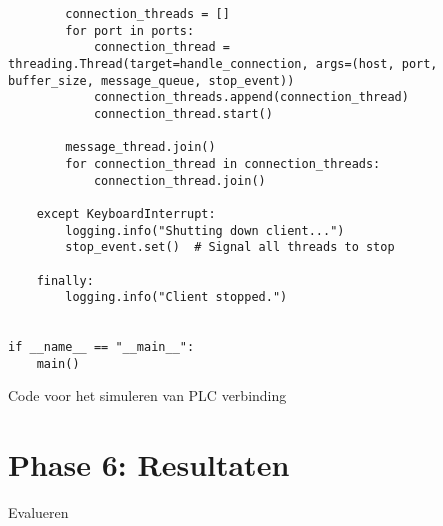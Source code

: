 \begin{listing}[h!]
\begin{verbatim}
        connection_threads = []
        for port in ports:
            connection_thread = threading.Thread(target=handle_connection, args=(host, port, buffer_size, message_queue, stop_event))
            connection_threads.append(connection_thread)
            connection_thread.start()

        message_thread.join()
        for connection_thread in connection_threads:
            connection_thread.join()

    except KeyboardInterrupt:
        logging.info("Shutting down client...")
        stop_event.set()  # Signal all threads to stop

    finally:
        logging.info("Client stopped.")


if __name__ == "__main__":
    main()

    \end{verbatim}
    \caption[Python code PLC sim]{Code voor het simuleren van PLC verbinding}
\end{listing}

\section{Phase 6: Resultaten}

Evalueren
